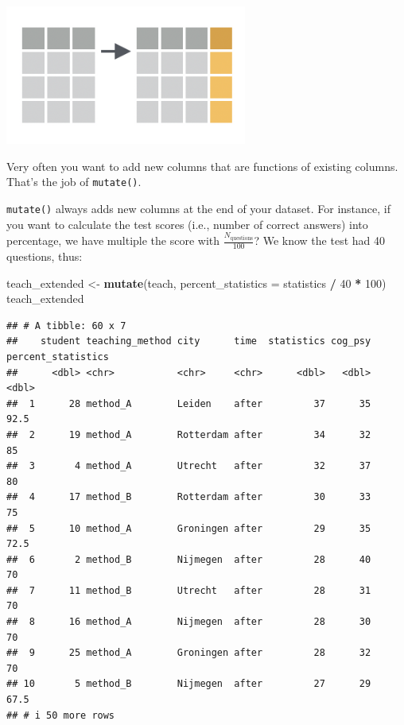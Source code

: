 \documentclass[
]{scrartcl}
\newenvironment{Shaded}{\begin{snugshade}}{\end{snugshade}}
\newcommand{\DataTypeTok}[1]{\textcolor[rgb]{0.13,0.29,0.53}{#1}}
\newcommand{\DecValTok}[1]{\textcolor[rgb]{0.00,0.00,0.81}{#1}}
\newcommand{\KeywordTok}[1]{\textcolor[rgb]{0.13,0.29,0.53}{\textbf{#1}}}
\newcommand{\NormalTok}[1]{#1}
\newcommand{\OperatorTok}[1]{\textcolor[rgb]{0.81,0.36,0.00}{\textbf{#1}}}
\newcommand{\StringTok}[1]{\textcolor[rgb]{0.31,0.60,0.02}{#1}}
\begin{document}
\begin{center}\includegraphics[width=300px]{images/dplyr-mutate} \end{center}

Very often you want to add new columns that are functions of existing columns. That's the job of \texttt{mutate()}.

\texttt{mutate()} always adds new columns at the end of your dataset. For instance, if you want to calculate the test scores (i.e., number of correct answers) into percentage, we have multiple the score with \(\frac{N_\text{questions}}{100}\)? We know the test had 40 questions, thus:

\begin{Shaded}
\begin{Highlighting}[]
\NormalTok{teach\_extended \textless{}{-}}\StringTok{ }\KeywordTok{mutate}\NormalTok{(teach, }\DataTypeTok{percent\_statistics =}\NormalTok{ statistics }\OperatorTok{/}\StringTok{ }\DecValTok{40} \OperatorTok{*}\StringTok{ }\DecValTok{100}\NormalTok{)}
\NormalTok{teach\_extended}
\end{Highlighting}
\end{Shaded}

\begin{verbatim}
## # A tibble: 60 x 7
##    student teaching_method city      time  statistics cog_psy percent_statistics
##      <dbl> <chr>           <chr>     <chr>      <dbl>   <dbl>              <dbl>
##  1      28 method_A        Leiden    after         37      35               92.5
##  2      19 method_A        Rotterdam after         34      32               85  
##  3       4 method_A        Utrecht   after         32      37               80  
##  4      17 method_B        Rotterdam after         30      33               75  
##  5      10 method_A        Groningen after         29      35               72.5
##  6       2 method_B        Nijmegen  after         28      40               70  
##  7      11 method_B        Utrecht   after         28      31               70  
##  8      16 method_A        Nijmegen  after         28      30               70  
##  9      25 method_A        Groningen after         28      32               70  
## 10       5 method_B        Nijmegen  after         27      29               67.5
## # i 50 more rows
\end{verbatim}
\end{document}
